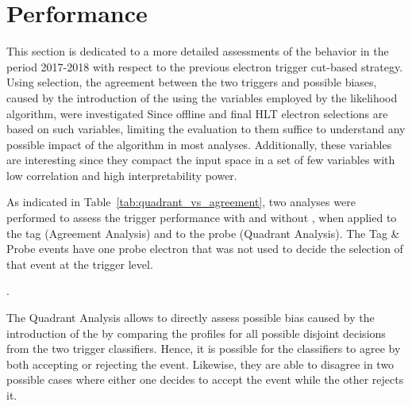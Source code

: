 
\chapter{\rnn{} Performance}%
\label{sec:off_ana}

This section is dedicated to a more detailed assessments of the \rnn{} behavior 
in the period 2017-2018 with respect to the previous electron trigger cut-based strategy.
Using \Zee{} \tnp{} selection, the agreement between the two triggers and
possible biases, caused by the introduction of the \rnn{} using the variables
employed by the likelihood algorithm, were investigated
Since offline and final HLT electron
selections are based on such variables, limiting the evaluation to them suffice
to understand any possible impact of the \rnn{} algorithm in most analyses.
Additionally, these variables are interesting since they compact the input space
in a set of few variables with low correlation and high interpretability power. 

As indicated in Table~\ref{tab:quadrant_vs_agreement}, two analyses were performed to assess the
trigger performance with and without \rnn{}, when applied to the tag (Agreement Analysis) and
to the probe (Quadrant Analysis). The Tag \& Probe events have one probe electron that was not 
used to decide the selection of that event at the trigger level.


\begin{table}[ht!]\footnotesize
\centering
\caption{Customized \Zee{} \tap{} selection criteria employed in the
agreement and quadrant analyses in the Run 2 (2017-2018 period)}.%
\label{tab:quadrant_vs_agreement}
\end{table}

The Quadrant Analysis allows to directly assess possible bias caused by the
introduction of the \rnn{} by comparing the profiles for all possible disjoint
decisions from the two trigger classifiers. Hence, it is possible for the classifiers
to agree by both accepting or rejecting the event. Likewise, they are able to
disagree in two possible cases where either one decides to accept the event
while the other rejects it.

